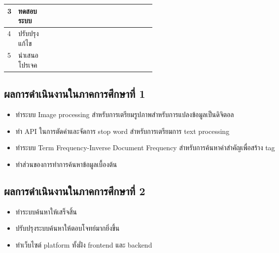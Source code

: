 \begin{table}[H]
\begin{tabular}{|l|p{0.35\linewidth}|l|l|l|l|l|l|l|l|l|l|l|l|l|l|l|l|}
3                  & ทดสอบระบบ                   &                          &                          &                          &                          & \cellcolor[HTML]{656565} & \cellcolor[HTML]{656565} & \cellcolor[HTML]{656565} & \cellcolor[HTML]{656565} & \cellcolor[HTML]{656565} & \cellcolor[HTML]{656565} & \cellcolor[HTML]{656565} & \cellcolor[HTML]{656565} & \cellcolor[HTML]{656565} & \cellcolor[HTML]{656565} &                          &                          \\ \hline
4                  & ปรับปรุงแก้ไข                   &                          &                          &                          &                          & \cellcolor[HTML]{656565} & \cellcolor[HTML]{656565} & \cellcolor[HTML]{656565} & \cellcolor[HTML]{656565} & \cellcolor[HTML]{656565} & \cellcolor[HTML]{656565} & \cellcolor[HTML]{656565} & \cellcolor[HTML]{656565} & \cellcolor[HTML]{656565} & \cellcolor[HTML]{656565} &                          &                          \\ \hline
5                  & นำเสนอโปรเจค                   &                          &                          &                          &                          &                          &                          &                          &                          &                          &                          &                          &                          &                          &                          & \cellcolor[HTML]{656565} & \cellcolor[HTML]{656565} \\ \hline
\end{tabular}
\end{table}

\subsection{ผลการดำเนินงานในภาคการศึกษาที่ 1}
\begin{itemize}
    \item ทำระบบ Image processing สำหรับการเตรียมรูปภาพสำหรับการแปลงข้อมูลเป็นดิจิตอล
    \item ทำ API ในการตัดคำและจัดการ stop word สำหรับการเตรียมการ text processing
    \item ทำระบบ Term Frequency-Inverse Document Frequency สำหรับการค้นหาคำสำคัญเพื่อสร้าง tag 
    \item ทำส่วนของการทำการค้นหาข้อมูลเบื้องต้น
\end{itemize}

\subsection{ผลการดำเนินงานในภาคการศึกษาที่ 2}
\begin{itemize}
    \item ทำระบบค้นหาให้เสร็จสิ้น
    \item ปรับปรุงระบบค้นหาให้ตอบโจทย์มากยิ่งขึ้น
    \item ทำเว็บไซต์ platform ทั้งฝั่ง frontend และ backend
\end{itemize}
